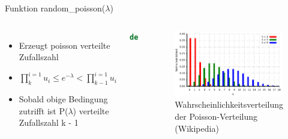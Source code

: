 \begin{frame}[fragile]{Funktion random\_poisson($\lambda$)}
  \begin{columns}
    \begin{itemize}
  	\item Erzeugt poisson verteilte Zufallszahl
  	\item $\prod_{k}^{i=1}u_i \leq e^{-\lambda} < \prod_{k-1}^{i=1}u_i$
  	\item Sobald obige Bedingung zutrifft ist P($\lambda$) verteilte Zufallszahl k - 1
  \end{itemize}
  \begin{lstlisting}[language=python]
def random_poisson(lambd):
  k = 0
  u_list = []
  middle_value = exp(-lambd)
  while True:
    k += 1
    u_list.append(random.random())
    left_side = product(u_list)
    right_side = product(u_list[0:-1])
    if left_side <= middle_value < right_side:
      break
  return k - 1
\end{lstlisting}
\logopythonbottom
    	\begin{figure}[h!]
    	\includegraphics[scale=0.2]{lib_random_poisson_wahrscheinlichkeitsverteilung.png}
  			\caption{Wahrscheinlichkeitsverteilung der Poisson-Verteilung \tiny{(Wikipedia)}}
		\end{figure}
  \end{columns}
\end{frame}	